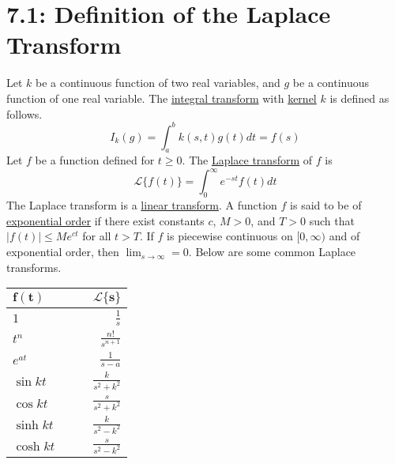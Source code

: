 \documentclass{article}
\newcommand{\lpl}{\mathscr{L}}
\begin{document}
\section*{7.1: Definition of the Laplace Transform}
Let \(k\) be a continuous function of two real variables, and \(g\) be a continuous function of one real variable. The \underline{integral transform} with \underline{kernel} \(k\) is defined as follows.
\[I_k(g)=\int_a^bk(s,t)g(t)dt=f(s)\]
Let \(f\) be a function defined for \(t\geq 0\). The \underline{Laplace transform} of \(f\) is
\[\lpl\{f(t)\}=\int_0^\infty e^{-st}f(t)dt\]
The Laplace transform is a \underline{linear transform}. A function \(f\) is said to be of \underline{exponential order} if there exist constants \(c\), \(M>0\), and \(T>0\) such that \(|f(t)|\leq Me^{ct}\) for all \(t>T\). If \(f\) is piecewise continuous on \([0, \infty)\) and of exponential order, then \(\lim_{s\rightarrow\infty}=0\). Below are some common Laplace transforms.
\newline
\newline
\def\arraystretch{1.5}%
\begin{tabularx}{\textwidth}{l X X r}
\toprule
\(\bm{f(t)}\) &&& \(\bm{\lpl\{s\}}\) \\
\midrule
\(1\) &&& \(\frac{1}{s}\) \\
\(t^n\) &&& \(\frac{n!}{s^{n+1}}\) \\
\(e^{at}\) &&& \(\frac{1}{s-a}\) \\
\(\sin kt\) &&& \(\frac{k}{s^2+k^2}\)\\
\(\cos kt\) &&& \(\frac{s}{s^2+k^2}\)\\
\(\sinh kt\) &&& \(\frac{k}{s^2-k^2}\)\\
\(\cosh kt\) &&& \(\frac{s}{s^2-k^2}\)\\
\bottomrule
\end{tabularx}
\newpage
\end{document}
